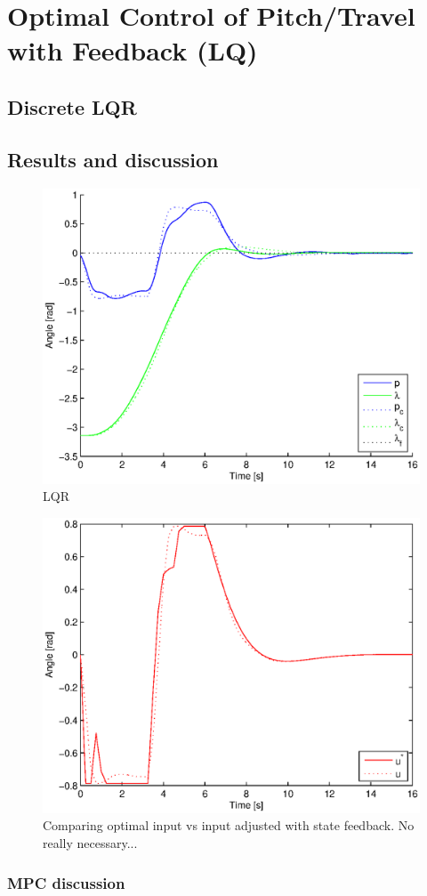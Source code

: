 \section{Optimal Control of Pitch/Travel with Feedback (LQ)}\label{sec:prob3}

\subsection{Discrete LQR}

\subsection{Results and discussion}

\begin{figure}[hp]
	\centering
		\includegraphics[width=1.00\textwidth]{figures/3/lqr.eps}
	\caption{LQR}
	\label{fig:lqr}
\end{figure}

\begin{figure}[hp]
	\centering
		\includegraphics[width=1.00\textwidth]{figures/3/input_comp.eps}
	\caption{Comparing optimal input vs input adjusted with state feedback. No really necessary...}
	\label{fig:lqr}
\end{figure}

\subsubsection{MPC discussion}
